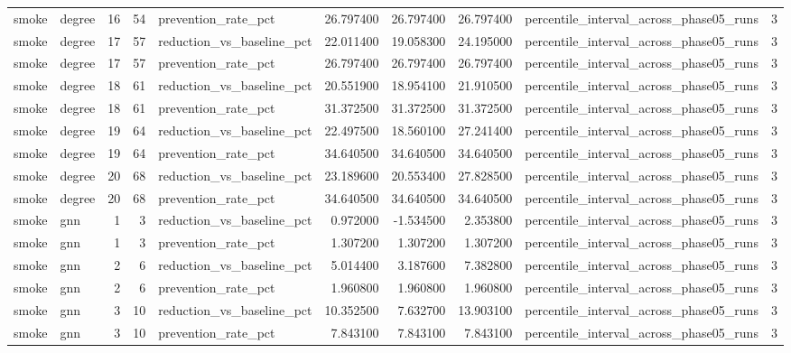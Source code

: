 \begin{tabular}{llrrlrrrlr}
smoke & degree & 16 & 54 & prevention\_rate\_pct & 26.797400 & 26.797400 & 26.797400 & percentile\_interval\_across\_phase05\_runs & 3 \\
smoke & degree & 17 & 57 & reduction\_vs\_baseline\_pct & 22.011400 & 19.058300 & 24.195000 & percentile\_interval\_across\_phase05\_runs & 3 \\
smoke & degree & 17 & 57 & prevention\_rate\_pct & 26.797400 & 26.797400 & 26.797400 & percentile\_interval\_across\_phase05\_runs & 3 \\
smoke & degree & 18 & 61 & reduction\_vs\_baseline\_pct & 20.551900 & 18.954100 & 21.910500 & percentile\_interval\_across\_phase05\_runs & 3 \\
smoke & degree & 18 & 61 & prevention\_rate\_pct & 31.372500 & 31.372500 & 31.372500 & percentile\_interval\_across\_phase05\_runs & 3 \\
smoke & degree & 19 & 64 & reduction\_vs\_baseline\_pct & 22.497500 & 18.560100 & 27.241400 & percentile\_interval\_across\_phase05\_runs & 3 \\
smoke & degree & 19 & 64 & prevention\_rate\_pct & 34.640500 & 34.640500 & 34.640500 & percentile\_interval\_across\_phase05\_runs & 3 \\
smoke & degree & 20 & 68 & reduction\_vs\_baseline\_pct & 23.189600 & 20.553400 & 27.828500 & percentile\_interval\_across\_phase05\_runs & 3 \\
smoke & degree & 20 & 68 & prevention\_rate\_pct & 34.640500 & 34.640500 & 34.640500 & percentile\_interval\_across\_phase05\_runs & 3 \\
smoke & gnn & 1 & 3 & reduction\_vs\_baseline\_pct & 0.972000 & -1.534500 & 2.353800 & percentile\_interval\_across\_phase05\_runs & 3 \\
smoke & gnn & 1 & 3 & prevention\_rate\_pct & 1.307200 & 1.307200 & 1.307200 & percentile\_interval\_across\_phase05\_runs & 3 \\
smoke & gnn & 2 & 6 & reduction\_vs\_baseline\_pct & 5.014400 & 3.187600 & 7.382800 & percentile\_interval\_across\_phase05\_runs & 3 \\
smoke & gnn & 2 & 6 & prevention\_rate\_pct & 1.960800 & 1.960800 & 1.960800 & percentile\_interval\_across\_phase05\_runs & 3 \\
smoke & gnn & 3 & 10 & reduction\_vs\_baseline\_pct & 10.352500 & 7.632700 & 13.903100 & percentile\_interval\_across\_phase05\_runs & 3 \\
smoke & gnn & 3 & 10 & prevention\_rate\_pct & 7.843100 & 7.843100 & 7.843100 & percentile\_interval\_across\_phase05\_runs & 3 \\

\end{tabular}
